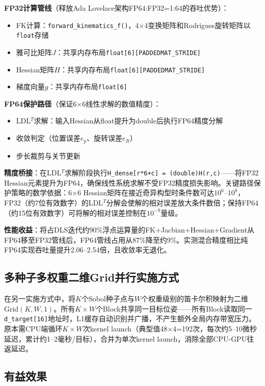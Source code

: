 \documentclass[a4paper,12pt]{ctexart}
\begin{document}
\textbf{FP32计算管线}（释放Ada Lovelace架构FP64:FP32=1:64的吞吐优势）：
\begin{itemize}
    \item FK计算：\texttt{forward\_kinematics\_f()}，4×4变换矩阵和Rodrigues旋转矩阵以\texttt{float}存储
    \item 雅可比矩阵$J$：共享内存布局\texttt{float[6][PADDEDMAT\_STRIDE]}
    \item Hessian矩阵$H$：共享内存布局\texttt{float[6][PADDEDMAT\_STRIDE]}
    \item 梯度向量$g$：共享内存布局\texttt{float[6]}
\end{itemize}

\textbf{FP64保护路径}（保证6×6线性求解的数值精度）：
\begin{itemize}
    \item LDL$^T$求解：输入Hessian从float提升为double后执行FP64精度分解
    \item 收敛判定（位置误差$e_p$、旋转误差$e_R$）
    \item 步长裁剪与关节更新
\end{itemize}

\textbf{精度桥接}：在LDL$^T$求解阶段执行\texttt{H\_dense[r*6+c] = (double)H(r,c)}——将FP32 Hessian元素提升为FP64，确保线性系统求解不受FP32精度损失影响。关键路径保护策略的数学依据：6×6 Hessian矩阵在接近奇异构型时条件数可达$10^6$--$10^8$，FP32（约7位有效数字）的LDL$^T$分解会使解的相对误差放大条件数倍；保持FP64（约15位有效数字）可将解的相对误差控制在$10^{-9}$量级。

\textbf{性能收益}：将占DLS迭代约90\%浮点运算量的FK+Jacbian+Hessian+Gradient从FP64移至FP32管线后，FP64管线占用从87\%降至约9\%。实测混合精度相比纯FP64实现吞吐量提升2.06--2.54倍，且收敛率无退化。

\subsection{多种子多权重二维Grid并行实施方式}

在另一实施方式中，将$K$个Sobol种子点与$W$个权重级别的笛卡尔积映射为二维Grid$(K,W,1)$。所有$K\times W$个Block共享同一目标位姿——所有Block读取同一\texttt{d\_target[16]}地址时，L1缓存自动识别并广播，不产生额外全局内存带宽压力。原本需CPU端循环$K\times W$次kernel launch（典型值48×4=192次，每次约5--10微秒延迟，累计约1--2毫秒/目标），合并为单次kernel launch，消除全部CPU-GPU往返延迟。

\subsection{有益效果}
\end{document}
